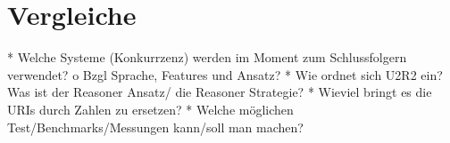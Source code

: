 \chapter{Vergleiche}
    * Welche Systeme (Konkurrzenz) werden im Moment zum Schlussfolgern verwendet?
          o Bzgl Sprache, Features und Ansatz? 
    * Wie ordnet sich U2R2 ein? Was ist der Reasoner Ansatz/ die Reasoner Strategie?
    * Wieviel bringt es die URIs durch Zahlen zu ersetzen?
    * Welche möglichen Test/Benchmarks/Messungen kann/soll man machen? 